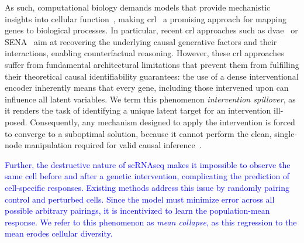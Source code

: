 \documentclass{article}
\begin{document}
As such, computational biology demands models that provide mechanistic insights into cellular function~\citep{chen_applying_2024}, making \gls{crl}~\citep{scholkopf2021toward} a promising approach for mapping genes to biological processes.
In particular, recent \gls{crl} approaches such as \gls{dvae}~\citep{zhang2023identifiability} or SENA~\citep{de2025interpretable} aim at recovering the underlying causal generative factors and their interactions, enabling counterfactual reasoning.
However, these \gls{crl} approaches suffer from fundamental architectural limitations that prevent them from fulfilling their theoretical causal identifiability guarantees: the use of a dense interventional encoder inherently means that every gene, including those intervened upon can influence all latent variables.
We term this phenomenon \emph{intervention spillover}, as it renders the task of identifying a unique latent target for an intervention ill-posed.
Consequently, any mechanism designed to apply the intervention is forced to converge to a suboptimal solution, because it cannot perform the clean, single-node manipulation required for valid causal inference~\citep{brehmer2022weakly,lippe2022citris}.

\textcolor{blue}{Further, the destructive nature of \gls{scRNAseq} makes it impossible to observe the same cell before and after a genetic intervention, complicating the prediction of cell-specific responses.
Existing methods address this issue by randomly pairing control and perturbed cells.
Since the model must minimize error across all possible arbitrary pairings, it is incentivized to learn the population-mean response.
We refer to this phenomenon as \emph{mean collapse}, as this regression to the mean erodes cellular diversity.}
\end{document}
